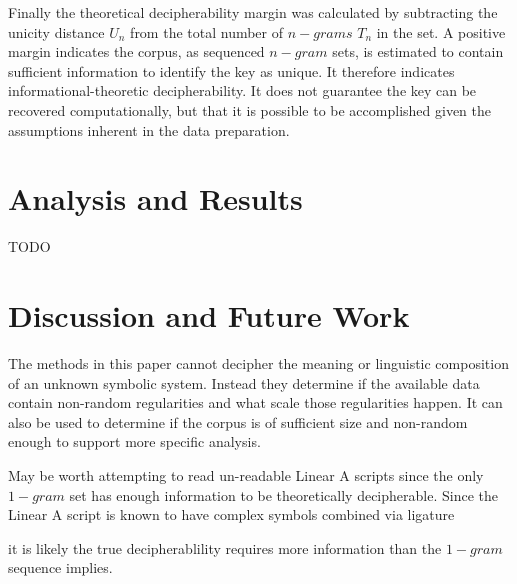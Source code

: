 \documentclass[preprint,12pt]{elsarticle}
\begin{document}
Finally the theoretical decipherability margin was calculated by subtracting the unicity distance \(U_n\) from the total number of \(n-grams\) \(T_n\) in the set. A positive margin indicates the corpus, as sequenced \(n-gram\) sets, is estimated to contain sufficient information to identify the key as unique. It therefore indicates informational-theoretic decipherability. It does not guarantee the key can be recovered computationally, but that it is possible to be accomplished given the assumptions inherent in the data preparation. 

\section{Analysis and Results} 
\label{anal_results}
TODO
\section{Discussion and Future Work}
\label{discussion}

The methods in this paper cannot decipher the meaning or linguistic composition of an unknown symbolic system. Instead they determine if the available data contain non-random regularities and what scale those regularities happen. It can also be used to determine if the corpus is of sufficient size and non-random enough to support more specific analysis. 

May be worth attempting to read un-readable Linear A scripts since the only \(1-gram\) set has enough information to be theoretically decipherable. Since the Linear A script is known to have complex symbols combined via ligature \cite{salgarella2021_sigla} 

it is likely the true decipherablility requires more information than the \(1-gram\) sequence implies. 
\newpage 
\appendix
\end{document}
